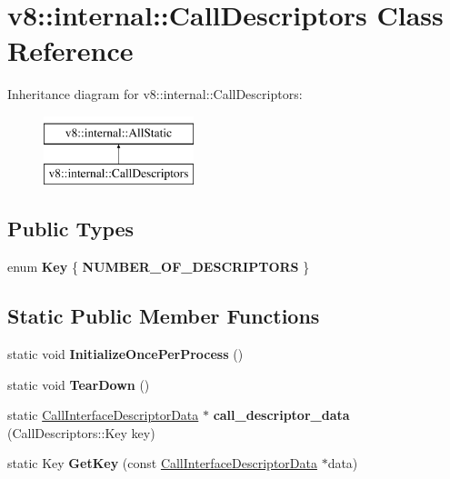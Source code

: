 \hypertarget{classv8_1_1internal_1_1CallDescriptors}{}\section{v8\+:\+:internal\+:\+:Call\+Descriptors Class Reference}
\label{classv8_1_1internal_1_1CallDescriptors}
Inheritance diagram for v8\+:\+:internal\+:\+:Call\+Descriptors\+:\begin{figure}[H]
\begin{center}
\leavevmode
\includegraphics[height=2.000000cm]{classv8_1_1internal_1_1CallDescriptors}
\end{center}
\end{figure}
\subsection*{Public Types}
\begin{DoxyCompactItemize}
\item 
\mbox{\label{classv8_1_1internal_1_1CallDescriptors_afda0eda47023333e46f2900f265bff79}} 
enum {\bfseries Key} \{ {\bfseries N\+U\+M\+B\+E\+R\+\_\+\+O\+F\+\_\+\+D\+E\+S\+C\+R\+I\+P\+T\+O\+RS}
 \}
\end{DoxyCompactItemize}
\subsection*{Static Public Member Functions}
\begin{DoxyCompactItemize}
\item 
\mbox{\label{classv8_1_1internal_1_1CallDescriptors_ab3941bd30cce63e4f6354351e51680fa}} 
static void {\bfseries Initialize\+Once\+Per\+Process} ()
\item 
\mbox{\label{classv8_1_1internal_1_1CallDescriptors_a2c5f6f28054c38270f014c86c49e328a}} 
static void {\bfseries Tear\+Down} ()
\item 
\mbox{\label{classv8_1_1internal_1_1CallDescriptors_a9dc02971451e1916dd5d26a440bdfc68}} 
static \mbox{\hyperlink{classv8_1_1internal_1_1CallInterfaceDescriptorData}{Call\+Interface\+Descriptor\+Data}} $\ast$ {\bfseries call\+\_\+descriptor\+\_\+data} (Call\+Descriptors\+::\+Key key)
\item 
\mbox{\label{classv8_1_1internal_1_1CallDescriptors_af6ff72e78056db9c6c9ae79af844c69f}} 
static Key {\bfseries Get\+Key} (const \mbox{\hyperlink{classv8_1_1internal_1_1CallInterfaceDescriptorData}{Call\+Interface\+Descriptor\+Data}} $\ast$data)
\end{DoxyCompactItemize}


